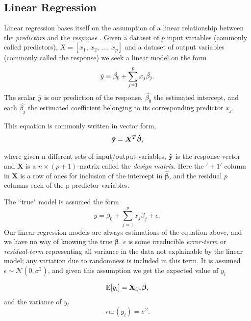 \subsection{Linear Regression}
Linear regression bases itself on the assumption of a linear relationship between the \textit{predictors} and the \textit{response} \cite[p.21-26]{fahrmeir}. 
Given a dataset of $p$ input variables (commonly called predictors), $X=[x_1, \, x_2, \, \ldots, \, x_p]$ and a dataset of output variables (commonly called the response) we seek a linear model on the form
\begin{equation}
\Tilde{y}=\hat{\beta_0}+\sum_{j=1}^{p}x_j\hat{\beta_j}.
\end{equation}
The scalar $\Tilde{y}$ is our prediction of the response, $\hat{\beta_0}$ the estimated intercept, and each $\hat{\beta_j}$ the estimated coefficient belonging to its corresponding predictor $x_j$. 

This equation is commonly written in vector form, 
\begin{equation}
\Tilde{\mathbf{y}}=\boldsymbol{X}^T\boldsymbol{\hat{\beta}},
\end{equation}

where given n different sets of input/output-variables, $\Tilde{\mathbf{y}}$ is the response-vector and $\boldsymbol{X}$ is a $n\times (p+1)$-matrix called the \textit{design matrix}\label{design-matrix}. Here the $'+1'$ column in $\boldsymbol{X}$ is a row of ones for inclusion of the intercept in $\boldsymbol{\hat{\beta}}$, and the residual $p$ columns each of the p predictor variables. 


The ``true" model is assumed the form 
\begin{equation}\label{OG_y}
y=\beta_0+\sum_{j=1}^{p}x_j\beta_j+\epsilon,
\end{equation}
Our linear regression models are always estimations of the equation above, and we have no way of knowing the true $\boldsymbol{\beta}$. 
$\epsilon$ is some irreducible \textit{error-term} or \textit{residual-term} representing all variance in the data not explainable by the linear model; any variation due to randomness is included in this term. It is assumed $\epsilon \sim  
\mathcal{N}(0,\sigma^2)$, and given this assumption we get the expected value of $y_i$

\begin{equation}\label{expected_y}
    \mathbb{E}[y_i] = \mathbf{X}_{i,*}\boldsymbol{\beta},
\end{equation}
and the variance of $y_i$
\begin{equation}\label{var_y}
    \text{var}(y_i) = \sigma^2.
\end{equation}



